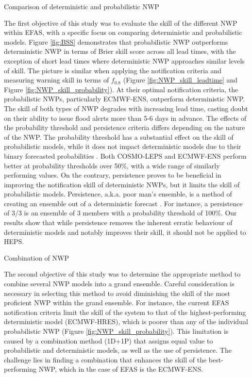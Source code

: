 \documentclass[preprint,12pt,authoryear]{elsarticle}
\begin{document}
Comparison of deterministic and probabilistic NWP

The first objective of this study was to evaluate the skill of the different NWP within EFAS, with a specific focus on comparing deterministic and probabilistic models. Figure \ref{fig:BSS} demonstrates that probabilistic NWP outperforms deterministic NWP in terms of Brier skill score across all lead times, with the exception of short lead times where deterministic NWP approaches similar levels of skill. The picture is similar when applying the notification criteria and measuring warning skill in terms of $f_{0.8}$ (Figure \ref{fig:NWP_skill_leadtime} and Figure \ref{fig:NWP_skill_probability}). At their optimal notification criteria, the probabilistic NWPs, particularly ECMWF-ENS, outperform deterministic NWP. The skill of both types of NWP degrades with increasing lead time, casting doubt on their ability to issue flood alerts more than 5-6 days in advance. The effects of the probability threshold and persistence criteria differs depending on the nature of the NWP. The probability threshold has a substantial effect on the skill of probabilistic models, while it does not impact deterministic models due to their binary forecasted probabilities . Both COSMO-LEPS and ECMWF-ENS perform better at probability thresholds over 50\%, with a wide range of similarly performing values. On the contrary, persistence proves to be beneficial in improving the notification skill of deterministic NWPs, but it limits the skill of probabilistic models. Persistence, a.k.a. poor man's ensemble, is a method of creating an ensemble out of a deterministic forecast \cite{Cloke2009}. For instance, a persistence of 3/3 is an ensemble of 3 members with a probability threshold of 100\%. Our results show that while persistence removes the inherent erratic behaviour of deterministic models and notably improves their skill, it should not be applied to HEPS. 

Combination of NWP

The second objective of this study was to determine the appropriate method to combine several NWP models into a grand ensemble. Careful consideration is necessary in selecting this method to avoid diminishing the skill of the most proficient NWP within the grand ensemble. For instance, the current EFAS notification criteria limit the skill of the system to that of the highest-performing deterministic model (ECMWF-HRES), which is poorer than any of the individual probabilistic NWP (Figure \ref{fig:NWP_skill_probability}). This limitation is caused by a combination method (1D+1P) that assigns equal value to probabilistic and deterministic models, as well as the use of persistence. The challenge lies in finding a combination that enhances the skill of the best-performing NWP, which in the case of EFAS is the ECMWF-ENS.
\end{document}
